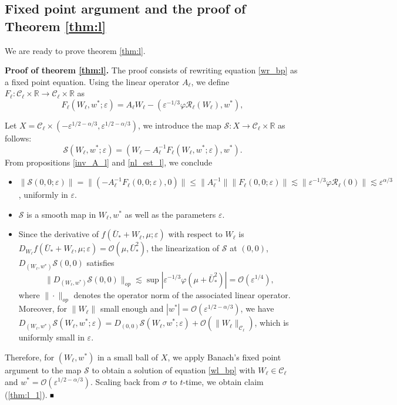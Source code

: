 \documentclass[letterpaper,11pt]{article}
\newcommand{\Ral}{\mathcal{R}}
\newcommand{\rmO}{\mathcal{O}}
\newcommand{\eps}{\varepsilon}
\newcommand{\lar}{ \lesssim }
\numberwithin{equation}{section}
\theoremstyle{plain}
\newenvironment{Proof}[1][.]%
 {\begin{trivlist}\item[]\textbf{Proof#1 }}%
 {\hspace*{\fill}$\rule{0.3\baselineskip}{0.35\baselineskip}$\end{trivlist}}
\begin{document}
\subsection{Fixed point argument and the proof of Theorem \ref{thm:l}}
We are ready to prove theorem \ref{thm:l}.
\begin{Proof}[ of theorem \ref{thm:l}.]
The proof consists of rewriting equation \eqref{wr_bp} as a fixed point equation. Using the linear operator $A_\ell$, we define
$F_\ell : \mathcal{C}_\ell \times \mathbb{R} \to \mathcal{C}_\ell \times \mathbb{R}$ as
\[
F_\ell(W_\ell, w^*; \eps) = A_\ell W_\ell - (\eps^{-1/3}\varphi \Ral_\ell(W_\ell), w^*),
\]

Let $X = \mathcal{C}_\ell \times (-\eps^{1/2-\alpha/3},\eps^{1/2-\alpha/3})$, we introduce the map $\mathcal{S}: X \to \mathcal{C}_\ell\times \mathbb{R}$ as follows:
\[
\mathcal{S}(W_\ell,w^*; \eps) = (W_\ell-A_\ell^{-1}F_\ell(W_\ell,w^*;\eps), w^*).
\]
From propositions \ref{inv_A_l} and \ref{nl_est_l}, we conclude 
\begin{itemize}
\item $\|\mathcal{S}(0,0;\eps) \|= \|\left( -A_\ell^{-1}F_\ell(0,0;\eps),0\right)\| \le \|A_\ell^{-1}\|\|F_\ell(0,0;\eps)\| \lar \|\eps^{-1/3}\varphi \Ral_\ell(0)\| \lar \eps^{\alpha/3}$, uniformly in $\eps$.

\item $\mathcal{S}$ is a smooth map in $W_\ell,w^*$ as well as the parameters $\eps$.

\item Since the derivative of $f(\bar{U}_*+W_\ell,\mu;\eps)$ with respect to $W_\ell$ is $D_{W_\ell} f(\bar{U}_*+W_\ell,\mu;\eps)=\rmO(\mu, \bar{U}_*^2)$, the linearization of $\mathcal{S}$ at $(0,0)$, $D_{(W_\ell,w^*)} \mathcal{S}(0,0)$ satisfies
\[
\|D_{(W_\ell,w^*)} \mathcal{S}(0,0)\|_{op} \lar \sup|\eps^{-1/3}\varphi(\mu+\bar{U}_*^2)| = \rmO(\eps^{1/4}),
\]
where $\|\cdot\|_{op}$ denotes the operator norm of the associated linear operator.
Moreover, for $\|W_{\ell}\|$ small enough and $|w^*| =\rmO(\eps^{1/2-\alpha/3})$, we have $D_{(W_\ell,w^*)}\mathcal{S}(W_\ell,w^*;\eps) =  D_{(0, 0)}\mathcal{S}(W_\ell,w^*;\eps)+\rmO(\|W_\ell\|_{\mathcal{C}_\ell})$, which is uniformly small in $\eps$.
\end{itemize}

Therefore, for $(W_\ell, w^*)$ in a small ball of $X$, we apply Banach's fixed point argument to the map $\mathcal{S}$ to obtain a solution of equation \eqref{wl_bp} with $W_\ell \in \mathcal{C}_\ell$ and $w^* = \rmO(\eps^{1/2-\alpha/3})$. Scaling back from $\sigma$ to $t$-time, we obtain claim (\ref{thm:l_1}).
\end{Proof}
\end{document}
